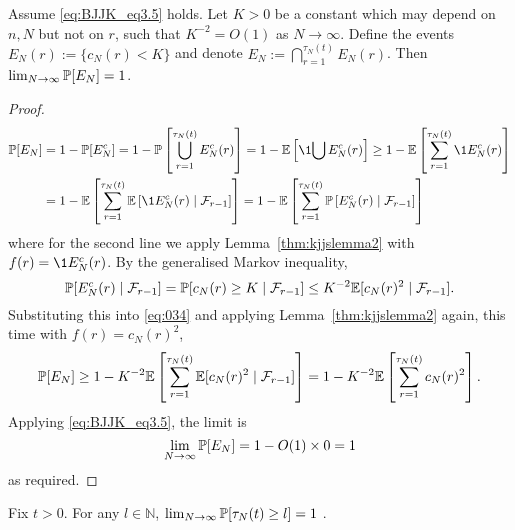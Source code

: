 \begin{lemma}\label{thm:indicators_cN}
Assume \eqref{eq:BJJK_eq3.5} holds.
Let $K>0$ be a constant which may depend on $n, N$ but not on $r$, such that $K^{-2} = O(1)$ as $N\to\infty$.
Define the events $E_N(r) := \{ c_N(r) < K \}$ and denote $E_N := \bigcap_{r=1}^{\tau_N(t)} E_N(r)$.
Then $\lim_{N\to\infty} \mathbb{P}[E_N]=1$.
\end{lemma}

\begin{proof}
\begin{align}
\Prob[E_N]
&= 1- \Prob[E_N^c]
= 1- \Prob\left[ \bigcup_{r=1}^{\tau_N(t)} E_N^c(r) \right]
= 1- \E\left[ \1{\bigcup E_N^c(r)} \right]
\geq 1 - \E\left[ \sum_{r=1}^{\tau_N(t)} \1{E_N^c(r)} \right] \notag\\
&= 1- \E\left[  \sum_{r=1}^{\tau_N(t)} \E\left[ \1{E_N^c(r)} 
        \mid \mathcal{F}_{r-1} \right] \right]
= 1- \E\left[  \sum_{r=1}^{\tau_N(t)} \Prob\left[ E_N^c(r)
        \mid \mathcal{F}_{r-1} \right] \right] \label{eq:034}
\end{align}
where for the second line we apply Lemma~\ref{thm:kjjslemma2} with $f(r) = \1{E_N^c(r)} $.
By the generalised Markov inequality,
\begin{equation*}
\mathbb{P}[ E_N^c(r) \mid \mathcal{F}_{r-1} ]
= \mathbb{P}[ c_N(r) \geq K \mid \mathcal{F}_{r-1} ]
\leq K^{-2} \mathbb{E}[c_N(r)^2 \mid \mathcal{F}_{r-1} ] .
\end{equation*}
Substituting this into \eqref{eq:034} and applying Lemma~\ref{thm:kjjslemma2} again, this time with $f(r) = c_N(r)^2$,
\begin{equation*}
\mathbb{P}[E_N]
\geq 1- K^{-2} \mathbb{E}\left[  \sum_{r=1}^{\tau_N(t)} 
        \mathbb{E}[c_N(r)^2 \mid \mathcal{F}_{r-1} ] \right]
= 1 - K^{-2} \mathbb{E}\left[  \sum_{r=1}^{\tau_N(t)} c_N(r)^2 \right] .
\end{equation*}
Applying \eqref{eq:BJJK_eq3.5}, the limit is
\begin{equation*}
\lim_{N\to\infty} \mathbb{P}[E_N]
= 1 - O(1) \times 0
=1 
\end{equation*}
as required.
\end{proof}


\begin{lemma}\label{thm:indicators_tau}
Fix $t>0$. For any $l \in \mathbb{N}$,
$\lim_{N\to\infty} \mathbb{P}[ \tau_N(t) \geq l ] =1$ .
\end{lemma}

